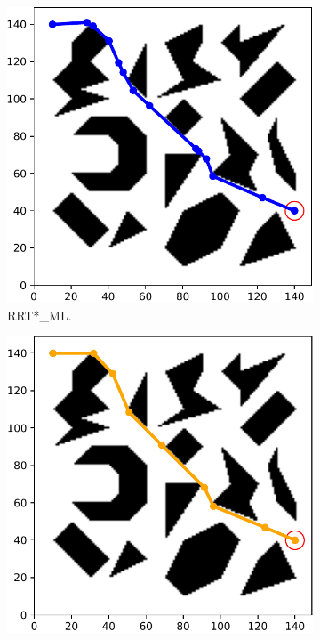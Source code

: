 \documentclass{ctuthesis}
\begin{document}
\begin{figure}[!ht]
  \centering
  \begin{subfigure}[b]{0.48\textwidth}
    \includegraphics[width=\textwidth]{figChap5/Maze_clutter_final_solution_RRTstarML.pdf}  
    \caption{RRT*\_ML.}
  \end{subfigure}  
  \begin{subfigure}[b]{0.48\textwidth}
    \includegraphics[width=\textwidth]{figChap5/Maze_clutter_final_solution_RRTstar2.pdf}  

\end{subfigure}
\end{figure}
\end{document}
